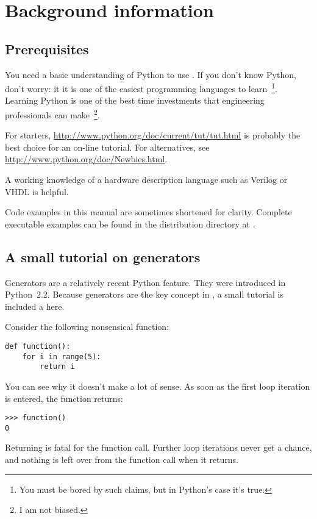 \chapter{Background information \label{background}}

\section{Prerequisites \label{prerequisites}}

You need a basic understanding of Python to use \myhdl{}.
If you don't know Python, don't worry: it
it is one of the easiest programming languages to
learn~\footnote{You must be bored by such claims, but in Python's
case it's true.}. Learning Python is one of the best time
investments that engineering professionals can make~\footnote{I am not
biased.}.

For starters, \url{http://www.python.org/doc/current/tut/tut.html} is
probably the best choice for an on-line tutorial. For alternatives,
see \url{http://www.python.org/doc/Newbies.html}.

A working knowledge of a hardware description language such as Verilog
or VHDL is helpful. 

Code examples in this manual are sometimes shortened for clarity.
 Complete executable examples can be found in the distribution directory at 
.

\section{A small tutorial on generators \label{tutorial}}

Generators are a relatively recent Python feature. They
were introduced in Python~2.2.
Because generators are the key concept in
\myhdl{}, a small tutorial is included a here.

Consider the following nonsensical function:

\begin{verbatim}
def function():
    for i in range(5):
        return i
\end{verbatim}

You can see why it doesn't make a lot of sense. As soon as the first
loop iteration is entered, the function returns:

\begin{verbatim}
>>> function()
0
\end{verbatim}

Returning is fatal for the function call. Further loop iterations
never get a chance, and nothing is left over from the function call
when it returns.

